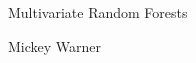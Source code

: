 \begin{center}
\begin{LARGE}
Multivariate Random Forests
\end{LARGE}

\begin{Large}
Mickey Warner
\end{Large}

\end{center}
